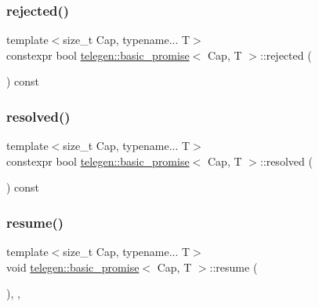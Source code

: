 \subsubsection{\texorpdfstring{rejected()}{rejected()}}
{\footnotesize\ttfamily template$<$size\+\_\+t Cap, typename... T$>$ \\
constexpr bool \hyperlink{classtelegen_1_1basic__promise}{telegen\+::basic\+\_\+promise}$<$ Cap, T $>$\+::rejected (\begin{DoxyParamCaption}{ }\end{DoxyParamCaption}) const\hspace{0.3cm}{\ttfamily [inline]}}

\mbox{\label{classtelegen_1_1basic__promise_af8d6af8cd8f1966c6602891df69bfd70}} 
\subsubsection{\texorpdfstring{resolved()}{resolved()}}
{\footnotesize\ttfamily template$<$size\+\_\+t Cap, typename... T$>$ \\
constexpr bool \hyperlink{classtelegen_1_1basic__promise}{telegen\+::basic\+\_\+promise}$<$ Cap, T $>$\+::resolved (\begin{DoxyParamCaption}{ }\end{DoxyParamCaption}) const\hspace{0.3cm}{\ttfamily [inline]}}

\mbox{\label{classtelegen_1_1basic__promise_a384761b0c7536d6b9ab3dc0f63c7e259}} 
\subsubsection{\texorpdfstring{resume()}{resume()}}
{\footnotesize\ttfamily template$<$size\+\_\+t Cap, typename... T$>$ \\
void \hyperlink{classtelegen_1_1basic__promise}{telegen\+::basic\+\_\+promise}$<$ Cap, T $>$\+::resume (\begin{DoxyParamCaption}{ }\end{DoxyParamCaption})\hspace{0.3cm}{\ttfamily [inline]}, {\ttfamily [override]}, {\ttfamily [virtual]}}




